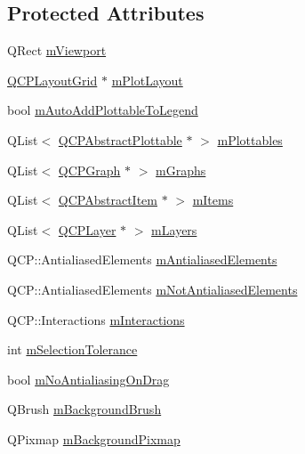 \subsection*{Protected Attributes}
\begin{DoxyCompactItemize}
\item 
Q\+Rect \hyperlink{class_q_custom_plot_ac0a7c38a715526c257cff95774f83ab6}{m\+Viewport}
\item 
\hyperlink{class_q_c_p_layout_grid}{Q\+C\+P\+Layout\+Grid} $\ast$ \hyperlink{class_q_custom_plot_ac97298756882a0eecd98151679850ac1}{m\+Plot\+Layout}
\item 
bool \hyperlink{class_q_custom_plot_aaf3ea6a4cb04d35a149cc9a0cdac3394}{m\+Auto\+Add\+Plottable\+To\+Legend}
\item 
Q\+List$<$ \hyperlink{class_q_c_p_abstract_plottable}{Q\+C\+P\+Abstract\+Plottable} $\ast$ $>$ \hyperlink{class_q_custom_plot_a62bf8e4e7f8d23fc1e9301ba0148269f}{m\+Plottables}
\item 
Q\+List$<$ \hyperlink{class_q_c_p_graph}{Q\+C\+P\+Graph} $\ast$ $>$ \hyperlink{class_q_custom_plot_adaf8d407d72a725169d7dbed2ee386bb}{m\+Graphs}
\item 
Q\+List$<$ \hyperlink{class_q_c_p_abstract_item}{Q\+C\+P\+Abstract\+Item} $\ast$ $>$ \hyperlink{class_q_custom_plot_a6a93905372326e31e98d6c3bc8953ec8}{m\+Items}
\item 
Q\+List$<$ \hyperlink{class_q_c_p_layer}{Q\+C\+P\+Layer} $\ast$ $>$ \hyperlink{class_q_custom_plot_a72ee313041b873d76c198793ce7e6c37}{m\+Layers}
\item 
Q\+C\+P\+::\+Antialiased\+Elements \hyperlink{class_q_custom_plot_aa333200629256830e273873b582a5524}{m\+Antialiased\+Elements}
\item 
Q\+C\+P\+::\+Antialiased\+Elements \hyperlink{class_q_custom_plot_a2b6ebcad00a90ba07f146cefcd4293da}{m\+Not\+Antialiased\+Elements}
\item 
Q\+C\+P\+::\+Interactions \hyperlink{class_q_custom_plot_ad717377ceba7493b4b32f0bcbbdf1895}{m\+Interactions}
\item 
int \hyperlink{class_q_custom_plot_abc36e12dd0482117ad810a800c847722}{m\+Selection\+Tolerance}
\item 
bool \hyperlink{class_q_custom_plot_ac83df968435f6b8ec79f2993ab9124e8}{m\+No\+Antialiasing\+On\+Drag}
\item 
Q\+Brush \hyperlink{class_q_custom_plot_a3aef5de4ac012178e3293248e9c63737}{m\+Background\+Brush}
\item 
Q\+Pixmap \hyperlink{class_q_custom_plot_ae8f4677399324a78c5f8dbfb95a34f90}{m\+Background\+Pixmap}

\end{DoxyCompactItemize}
